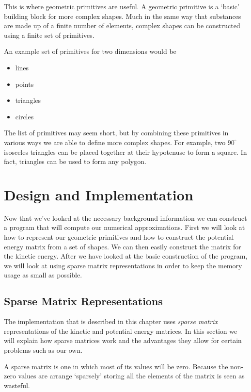 \documentclass[authoryearcitations]{UoYCSproject}
\begin{document}
This is where geometric primitives are useful. A geometric primitive is a `basic' building block for more complex shapes. 
Much in the same way that substances are made up of a finite number of elements, complex shapes can be constructed using
a finite set of primitives. 

An example set of primitives for two dimensions would be

\begin{itemize}
        \item lines
        \item points
        \item triangles
        \item circles
\end{itemize}

The list of primitives may seem short, but by combining these primitives in various ways we are able to define more
complex shapes. For example, two $90^{\circ}$ isosceles triangles can be placed together at their hypotenuse to form 
a square. In fact, triangles can be used to form any polygon. 

\chapter{Design and Implementation}
Now that we've looked at the necessary background information we can construct a program that will 
compute our numerical approximations. First we will look at how to represent our geometric primitives 
and how to construct the potential energy matrix from a set of shapes. We can then easily construct
the matrix for the kinetic energy. After we have looked at the basic construction of the program, we 
will look at using sparse matrix representations in order to keep the memory usage as small as possible.

\section{Sparse Matrix Representations}
The implementation that is described in this chapter uses \emph{sparse matrix} representations of the
kinetic and potential energy matrices. In this section we will explain how sparse matrices work and the advantages
they allow for certain problems such as our own. 

A sparse matrix is one in which most of its values will be zero. Because the non-zero values are arrange `sparsely'
storing all the elements of the matrix is seen as wasteful. 
\end{document}
